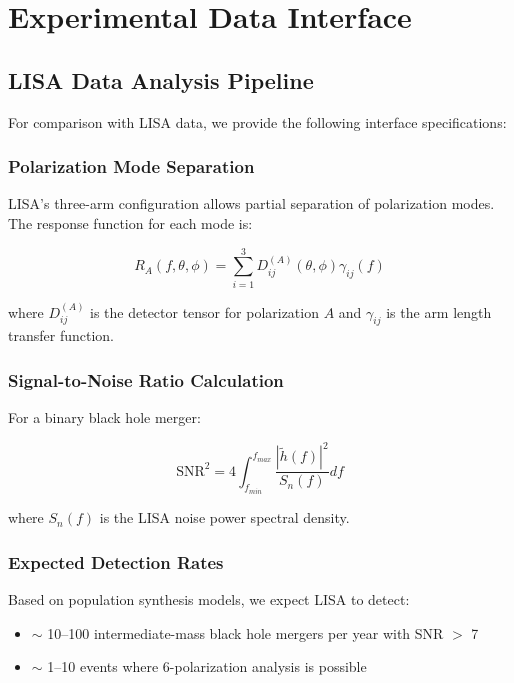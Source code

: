 \chapter{Experimental Data Interface}
\label{app:experimental}

\section{LISA Data Analysis Pipeline}

For comparison with LISA data, we provide the following interface specifications:

\subsection{Polarization Mode Separation}

LISA's three-arm configuration allows partial separation of polarization modes. The response function for each mode is:

\begin{equation}
    R_A(f, \theta, \phi) = \sum_{i=1}^3 D_{ij}^{(A)}(\theta, \phi) \gamma_{ij}(f)
\end{equation}

where $D_{ij}^{(A)}$ is the detector tensor for polarization $A$ and $\gamma_{ij}$ is the arm length transfer function.

\subsection{Signal-to-Noise Ratio Calculation}

For a binary black hole merger:

\begin{equation}
    \text{SNR}^2 = 4 \int_{f_{min}}^{f_{max}} \frac{|\tilde{h}(f)|^2}{S_n(f)} df
\end{equation}

where $S_n(f)$ is the LISA noise power spectral density.

\subsection{Expected Detection Rates}

Based on population synthesis models, we expect LISA to detect:

\begin{itemize}
    \item $\sim$ 10--100 intermediate-mass black hole mergers per year with SNR $>$ 7
    \item $\sim$ 1--10 events where 6-polarization analysis is possible
\end{itemize}

